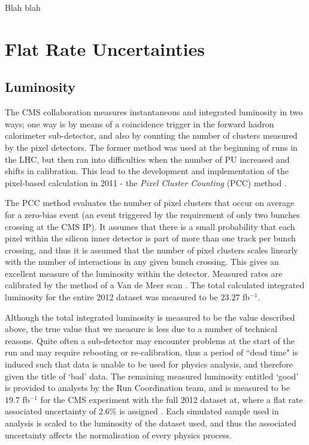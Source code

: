 Blah blah \cite{lumiScans} \cite{PCC}

\section{Flat Rate Uncertainties} \label{sec-FlateRateUncertainties}

\subsection{Luminosity} \label{subsec-Luminosity}

The CMS collaboration measures instantaneous and integrated luminosity in two ways; one way is by means of a coincidence trigger in the forward hadron calorimeter sub-detector, and also by counting the number of clusters measured by the pixel detectors. The former method was used at the beginning of runs in the LHC, but then ran into difficulties when the number of PU increased and shifts in calibration. This lead to the development and implementation of the pixel-based calculation in 2011 - the \emph{Pixel Cluster Counting} (PCC) method \cite{cmslumiwinter2012}.

The PCC method evaluates the number of pixel clusters that occur on average for a zero-bias event (an event triggered by the requirement of only two bunches crossing at the CMS IP). It assumes that there is a small probability that each pixel within the silicon inner detector is part of more than one track per bunch crossing, and thus it is assumed that the number of pixel clusters scales linearly with the number of interactions in any given bunch crossing. This gives an excellent measure of the luminosity within the detector. Measured rates are calibrated by the method of a Van de Meer scan \cite{White:1357865}. The total calculated integrated luminosity for the entire 2012 dataset was measured to be $23.27$ fb$^{-1}$.

Although the total integrated luminosity is measured to be the value described above, the true value that we measure is less due to a number of technical reasons. Quite often a sub-detector may encounter problems at the start of the run and may require rebooting or re-calibration, thus a period of ``dead time" is induced such that data is unable to be used for physics analysis, and therefore given the title of `bad' data. The remaining measured luminosity entitled `good' is provided to analysts by the Run Coordination team, and is measured to be $19.7$ fb$^{-1}$ for the CMS experiment with the full 2012 dataset at, where a flat rate associated uncertainty of 2.6\% is assigned \cite{CMS-PAS-LUM-13-001}. Each simulated sample used in analysis is scaled to the luminosity of the dataset used, and thus the associated uncertainty affects the normalisation of every physics process.

